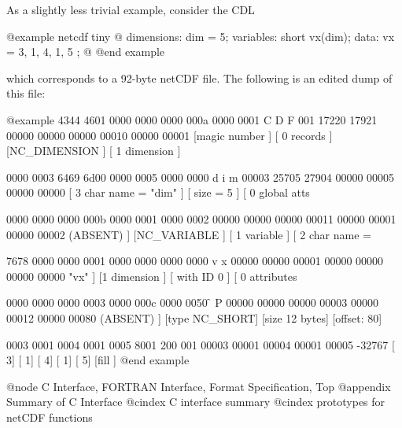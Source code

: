 {As a slightly less trivial example, consider the CDL

@example
netcdf tiny @{
dimensions:
        dim = 5;
variables:
        short vx(dim);
data:
        vx = 3, 1, 4, 1, 5 ;
@}
@end example

which corresponds to a 92-byte netCDF file.
The following is an edited dump of this file:

@example
   4344    4601    0000    0000    0000    000a    0000    0001
  C   D   F 001  \0  \0  \0  \0  \0  \0  \0  \n  \0  \0  
  17220   17921   00000   00000   00000   00010   00000   00001
[magic number ] [  0 records  ] [NC_DIMENSION ] [ 1 dimension ]

   0000    0003    6469    6d00    0000    0005    0000    0000
 \0  \0     d   i   m  \0  \0  \0    \0  \0  \0     00003   25705   27904   00000   00005   00000   00000
[  3 char name = "dim"        ] [ size = 5    ] [ 0 global atts

   0000    0000    0000    000b    0000    0001    0000    0002
 \0  \0  \0  \0  \0  \0    \0  \0    \0  \0  
  00000   00000   00000   00011   00000   00001   00000   00002
 (ABSENT)     ] [NC_VARIABLE  ] [ 1 variable  ] [ 2 char name =

   7678    0000    0000    0001    0000    0000    0000    0000
  v   x  \0  \0  \0  \0    \0  \0  \0  \0  \0  \0  \0     00000   00000   00001   00000   00000   00000   00000
 "vx"         ] [1 dimension  ] [ with ID 0   ] [ 0 attributes

   0000    0000    0000    0003    0000    000c    0000    0050
 \0  \0  \0  \0  \0  \0    \0  \0  \0  \f  \0  \0  \0   P
  00000   00000   00000   00003   00000   00012   00000   00080
 (ABSENT)     ] [type NC_SHORT] [size 12 bytes] [offset:    80]

   0003    0001    0004    0001    0005    8001
          200 001
  00003   00001   00004   00001   00005  -32767
[    3] [    1] [    4] [    1] [    5] [fill ]
@end example

@node C Interface, FORTRAN Interface, Format Specification, Top
@appendix Summary of C Interface
@cindex C interface summary
@cindex prototypes for netCDF functions

}
